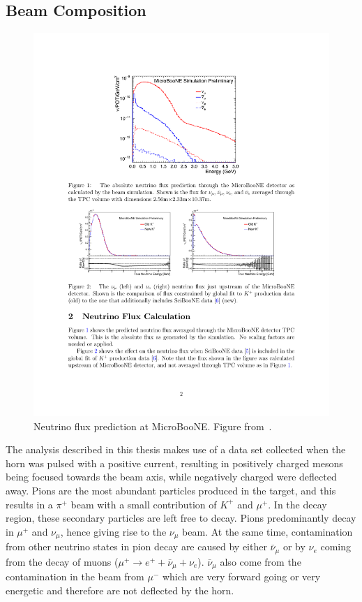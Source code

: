 \subsection{Beam Composition}
\label{sec:composition}

\begin{figure}[]
\centering
\includegraphics[width=.70\textwidth]{images/MicroBooNE/flux}
\caption[Neutrino Flux Prediction at MicroBooNE]{Neutrino flux prediction at MicroBooNE. Figure from~\cite{flux_note}.}
\label{fig:flux}
\end{figure}

The analysis described in this thesis makes use of a data set collected when the horn was pulsed with a positive current, resulting in positively charged mesons being focused towards the beam axis, while negatively charged were deflected away. 
Pions are the most abundant particles produced in the target, and this results in a $\pi^+$ beam with a small contribution of $K^+$ and $\mu^+$. In the decay region, these secondary particles are left free to decay. Pions predominantly decay in $\mu^+$ and $\nu_\mu$, hence giving rise to the $\nu_\mu$ beam. At the same time, contamination from other neutrino states in pion decay are caused by either $\bar{\nu}_\mu$ or by $\nu_e$ coming from the decay of muons ($\mu^+ \rightarrow e^+ + \bar{\nu}_\mu + \nu_e$). $\bar{\nu}_\mu$ also come from the contamination in the beam from $\mu^-$ which are very forward going or very energetic and therefore are not deflected by the horn.

